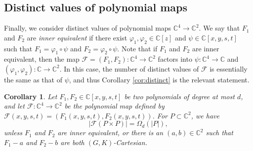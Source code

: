 \documentclass{daj}
\newtheorem{corollary}[theorem]{Corollary}
\theoremstyle{definition}
\newcommand{\C}{\mathbb C}
\begin{document}
\subsection{Distinct values of polynomial maps}
Finally, we consider distinct values of polynomial maps $\C^4\to \C^2$.
We say that $F_1$ and $F_2$ are \emph{inner equivalent} if there exist $\varphi_1,\varphi_2\in \C[z]$ and $\psi\in\C[x,y,s,t]$ such that $F_1 = \varphi_1\circ \psi$ and $F_2 = \varphi_2\circ \psi$.
Note that if $F_1$ and $F_2$ are inner equivalent, then the map $\mathcal{F} = (F_1,F_2):\C^4\to \C^2$ factors into $\psi:\C^4\to \C$ and $(\varphi_1,\varphi_2):\C\to \C^2$.
In this case, the number of distinct values of $\mathcal{F}$ is essentially the same as that of $\psi$, and thus Corollary \ref{cor:distinct} is the relevant statement.

\begin{corollary}\label{cor:mapdistinct}
Let $F_1,F_2\in \C[x,y,s,t]$ be two polynomials of degree at most $d$, and let $\mathcal{F}:\C^4\to\C^2$ be the polynomial map defined by $\mathcal{F}(x,y,s,t)= (F_1(x,y,s,t), F_2(x,y,s,t))$.
For $P\subset \C^2$, we have 
\[|\mathcal{F}(P\times P)| = \Omega_d(|P|),\]
unless $F_1$ and $F_2$ are inner equivalent, 
or there is an $(a,b)\in \C^2$ such that $F_1-a$ and $F_2-b$ are both $(G,K)$-Cartesian.
\end{corollary}
\end{document}
